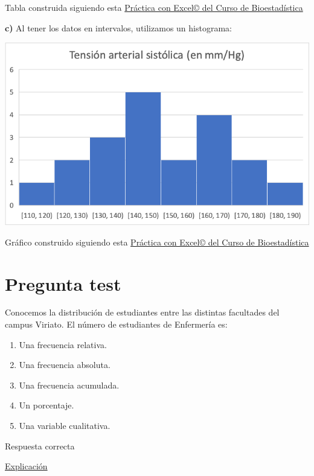\documentclass[
]{book}
\providecommand{\tightlist}{%
  \setlength{\itemsep}{0pt}\setlength{\parskip}{0pt}}
\begin{document}
Tabla construida siguiendo esta \href{https://1fjmanzano.github.io/bioestadistica/tablas-de-frecuencias.html\#tablas-de-frecuencias-pr\%C3\%A1ctica-3-con-excel}{Práctica con Excel© del Curso de Bioestadística}

\textbf{c)} Al tener los datos en intervalos, utilizamos un histograma:

\includegraphics[width=10.03in]{img/1_7}

Gráfico construido siguiendo esta \href{https://1fjmanzano.github.io/bioestadistica/histogramas.html\#histogramas-con-excel-pr\%C3\%A1cticas}{Práctica con Excel© del Curso de Bioestadística}

\hypertarget{pregunta-test-14}{%
\section{Pregunta test}\label{pregunta-test-14}}

Conocemos la distribución de estudiantes entre las distintas facultades del campus Viriato. El número de estudiantes de Enfermería es:

\begin{enumerate}
\def\labelenumi{\alph{enumi})}
\tightlist
\item
  Una frecuencia relativa.
\item
  Una frecuencia absoluta.
\item
  Una frecuencia acumulada.
\item
  Un porcentaje.
\item
  Una variable cualitativa.
\end{enumerate}

Respuesta correcta

\href{https://1fjmanzano.github.io/bioestadistica/tablas-de-frecuencias.html}{Explicación}
\end{document}
